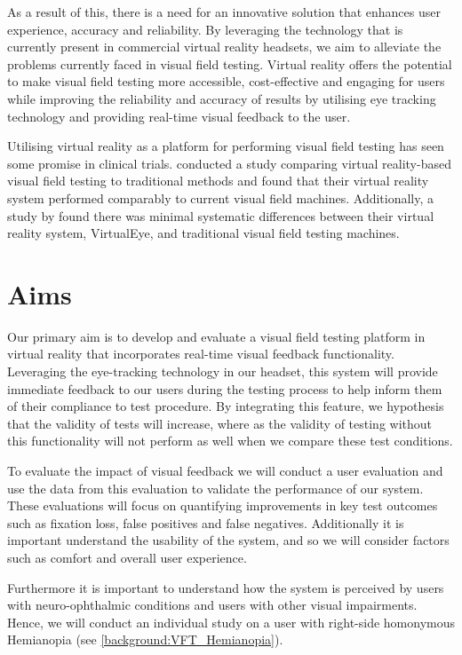 \documentclass{l4proj}
\begin{document}
As a result of this, there is a need for an innovative solution that enhances user experience, accuracy and reliability. By leveraging the technology that is currently present in commercial virtual reality headsets, we aim to alleviate the problems currently faced in visual field testing. Virtual reality offers the potential to make visual field testing more accessible, cost-effective and engaging for users while improving the reliability and accuracy of results by utilising eye tracking technology and providing real-time visual feedback to the user.

Utilising virtual reality as a platform for performing visual field testing has seen some promise in clinical trials. \cite{Stapelfeldt2021VRGlaucoma} conducted a study comparing virtual reality-based visual field testing to traditional methods and found that their virtual reality system performed comparably to current visual field machines. Additionally, a study by \cite{Wroblewski2014TestingVisualField} found there was minimal systematic differences between their virtual reality system, VirtualEye, and traditional visual field testing machines.

\section{Aims}
Our primary aim is to develop and evaluate a visual field testing platform in virtual reality that incorporates real-time visual feedback functionality. Leveraging the eye-tracking technology in our headset, this system will provide immediate feedback to our users during the testing process to help inform them of their compliance to test procedure. By integrating this feature, we hypothesis that the validity of tests will increase, where as the validity of testing without this functionality will not perform as well when we compare these test conditions.

To evaluate the impact of visual feedback we will conduct a user evaluation and use the data from this evaluation to validate the performance of our system. These evaluations will focus on quantifying improvements in key test outcomes such as fixation loss, false positives and false negatives. Additionally it is important understand the usability of the system, and so we will consider factors such as comfort and overall user experience.

Furthermore it is important to understand how the system is perceived by users with neuro-ophthalmic conditions and users with other visual impairments. Hence, we will conduct an individual study on a user with right-side homonymous Hemianopia (see \ref{background:VFT_Hemianopia}).
\end{document}
